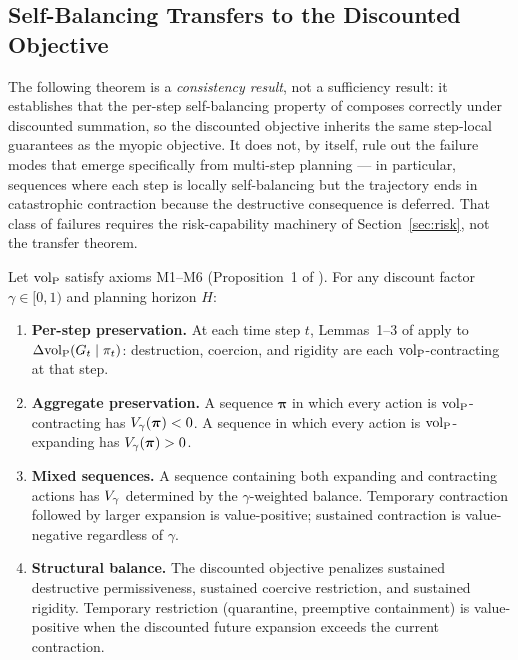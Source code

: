 \subsection{Self-Balancing Transfers to the Discounted Objective}

The following theorem is a \emph{consistency result}, not a sufficiency
result: it establishes that the per-step self-balancing property of
\citet{lasser2026gfm} composes correctly under discounted summation, so
the discounted objective inherits the same step-local guarantees as the
myopic objective. It does not, by itself, rule out the failure modes that
emerge specifically from multi-step planning --- in particular, sequences
where each step is locally self-balancing but the trajectory ends in
catastrophic contraction because the destructive consequence is deferred.
That class of failures requires the risk-capability machinery of
Section~\ref{sec:risk}, not the transfer theorem.

\begin{theorem}
\label{thm:discounted_self_balancing}
Let ${\operatorname{vol}_{\mathrm{P}}}$ satisfy axioms M1--M6 (Proposition~1 of
    \citet{lasser2026poset}).
    For any discount factor $\gamma \in [0, 1)$ and planning horizon $H$:
\begin{enumerate}
\item[\textbf{(a)}] \textbf{Per-step preservation.} At each time step $t$,
    Lemmas~1--3 of \citet{lasser2026gfm} apply to $\Delta {\operatorname{vol}_{\mathrm{P}}}(G_t \mid
    \pi_t)$: destruction, coercion, and rigidity are each
    ${\operatorname{vol}_{\mathrm{P}}}$-contracting at that step.
\item[\textbf{(b)}] \textbf{Aggregate preservation.} A sequence
    $\boldsymbol{\pi}$ in which every action is ${\operatorname{vol}_{\mathrm{P}}}$-contracting has
    $V_\gamma(\boldsymbol{\pi}) < 0$. A sequence in which every action is
    ${\operatorname{vol}_{\mathrm{P}}}$-expanding has $V_\gamma(\boldsymbol{\pi}) > 0$.
\item[\textbf{(c)}] \textbf{Mixed sequences.} A sequence containing both
    expanding and contracting actions has $V_\gamma$ determined by the
    $\gamma$-weighted balance. Temporary contraction followed by larger
    expansion is value-positive; sustained contraction is value-negative
    regardless of $\gamma$.
\item[\textbf{(d)}] \textbf{Structural balance.} The discounted objective
    penalizes sustained destructive permissiveness, sustained coercive
    restriction, and sustained rigidity. Temporary restriction
    (quarantine, preemptive containment) is value-positive when the
    discounted future expansion exceeds the current contraction.
\end{enumerate}
\end{theorem}

